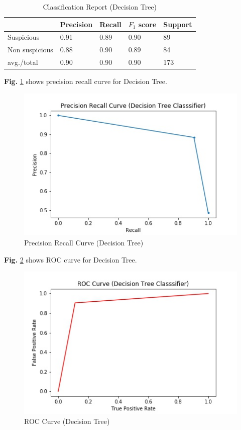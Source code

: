 \begin{table}[h!]
\begin{center}
\caption{Classification Report (Decision Tree)}
\begin{tabular}{|m{4.4cm} | m{2cm}| m{2cm}| m{2cm}| m{2cm}|}
\hline
     & Precision & Recall & $F_1$ score & Support \\
\hline
     Suspicious & 0.91 & 0.89 & 0.90 & 89\\
\hline 
     Non suspicious  & 0.88 & 0.90 & 0.89 & 84\\
\hline 
     avg./total & 0.90 & 0.90 & 0.90 & 173\\
\hline
\end{tabular}
\end{center}
\end{table}

\noindent
\textbf{Fig.} \ref{fig:prdct} shows precision recall curve for Decision Tree.

\begin{figure}[h!]
    \centering
    \includegraphics[scale=0.58]{Figures/PRDCT.jpg}
    \caption{Precision Recall Curve (Decision Tree)}
    \label{fig:prdct}
\end{figure}

\noindent
\textbf{Fig.} \ref{fig:rocdct} shows ROC curve for Decision Tree.

\begin{figure}[h!]
    \centering
    \includegraphics[scale=0.58]{Figures/ROCDCT.jpg}
    \caption{ROC Curve (Decision Tree)}
    \label{fig:rocdct}
\end{figure}

